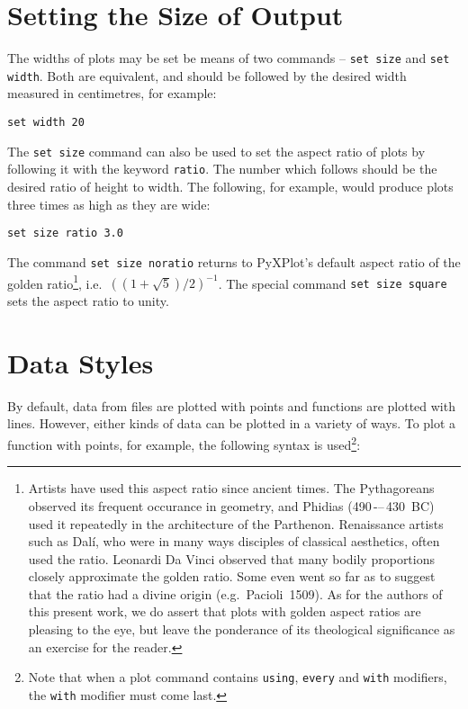 \section{Setting the Size of Output}

The widths of plots may be set be means of two commands -- {\tt set
size} and {\tt set width}. Both are
equivalent, and should be followed by the desired width measured in
centimetres, for example:

\begin{verbatim}
set width 20
\end{verbatim}

The {\tt set size} command can also be used to set the aspect ratio of plots by
following it with the keyword {\tt ratio}. The number
which follows should be the desired ratio of height to width. The following,
for example, would produce plots three times as high as they are wide:

\begin{verbatim}
set size ratio 3.0
\end{verbatim}

\noindent The command {\tt set size noratio} returns to PyXPlot's default
aspect ratio of the golden ratio\footnote{Artists have used this aspect ratio
since ancient times. The Pythagoreans observed its frequent occurance in
geometry, and Phidias (490\,-–\,430~{\scriptsize BC}) used it repeatedly in the
architecture of the Parthenon. Renaissance artists such as Dal\'i, who were in
many ways disciples of classical aesthetics, often used the ratio.  Leonardi Da
Vinci observed that many bodily proportions closely approximate the golden
ratio. Some even went so far as to suggest that the ratio had a divine origin
(e.g.\ Pacioli~1509). As for the authors of this present work, we do assert
that plots with golden aspect ratios are pleasing to the eye, but leave the
ponderance of its theological significance as an exercise for the reader.},
i.e.\ $\left((1+\sqrt{5})/2\right)^{-1}$. The special command {\tt set size
square} sets the aspect ratio to unity.

\section{Data Styles}

By default, data from files are plotted with points and functions are plotted
with lines. However, either kinds of data can be plotted in a variety of ways.
To plot a function with points, for example, the following syntax is
used\footnote{Note that when a plot command contains {\tt using}, {\tt every}
and {\tt with} modifiers, the {\tt with} modifier must come
last.}:

